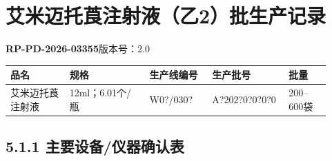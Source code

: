 \documentclass[UTF8,10pt,a4paper,fontset=fandol]{ctexart}
\newcommand{\fieldvalue}[1]{#1}
\newcommand{\handwritten}[1]{#1}
\begin{document}
\newpage

\section*{艾米迈托莨注射液（乙2）批生产记录}

\noindent
\textbf{RP-PD-2026-03355}\hfill 版本号：2.0

\begin{center}
\begin{tabular}{|p{0.17\linewidth}|p{0.23\linewidth}|p{0.18\linewidth}|p{0.22\linewidth}|p{0.12\linewidth}|}
\hline
品名 & 规格 & 生产线编号 & 生产批号 & 批量 \\
\hline
\fieldvalue{艾米迈托莨注射液} &
\fieldvalue{12ml；6.0\times 1个/瓶} &
\fieldvalue{\handwritten{W0?/030?}} &
\fieldvalue{\handwritten{A?202?0?0?0?0}} &
\fieldvalue{200--600袋}
\\
\hline
\end{tabular}
\end{center}

\subsection*{5.1.1 主要设备/仪器确认表}
\end{document}
